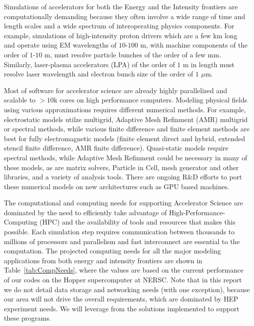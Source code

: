Simulations of accelerators for both the Energy and the Intensity frontiers are computationally demanding because they often involve a wide range of time and length scales and a wide spectrum of interoperating physics components. For example, simulations of high-intensity proton drivers which are a few km long and operate using EM wavelengths of $10$-$100$ m,  with machine components of the order of $1$-$10$ m, must resolve particle bunches of the order of a few mm. Similarly, laser-plasma accelerators (LPA) of the order of $1$ m in length must resolve laser wavelength and electron bunch size of the order of $1$ $\mu$m.

Most of software for accelerator science are already  highly parallelized and scalable to $> 10$k cores on high performance computers. Modeling physical fields using various approximations requires different numerical methods. For example, electrostatic models utilze multigrid, Adaptive Mesh Refinment (AMR) multigrid or spectral methods, while various finite difference and finite element methods are best for fully electromagnetic models (finite element direct and hybrid, extended stencil finite difference, AMR finite difference). Quasi-static models require spectral methods, while Adaptive Mesh Refinment could be necessary in many of these models, as are matrix solvers, Particle in Cell, mesh generator and other libraries, and a variety of analysis tools. There are ongoing R\&D efforts to port these numerical models on new architectures such as GPU based machines.

The computational and computing needs for supporting Accelerator
Science are dominated by the need to efficiently take advantage of 
High-Performance-Computing (HPC) and the availability of tools
and resources that makes this possible.  Each
simulation step requires communication between thousands to
millions of processors and parallelism and fast
interconnect are essential to the computation. The projected computing  needs for all
the major modeling applications from both energy and intensity
frontiers are shown in Table~\ref{tab:CompNeeds}, where the values 
are based on the current performance of our codes on the Hopper supercomputer at
NERSC. Note that in this report we do not detail data storage and
networking needs (with one exception), because our area will not
drive the overall requirements, which are dominated by HEP
experiment needs.  We will leverage from the solutions
implemented to support these programs.

